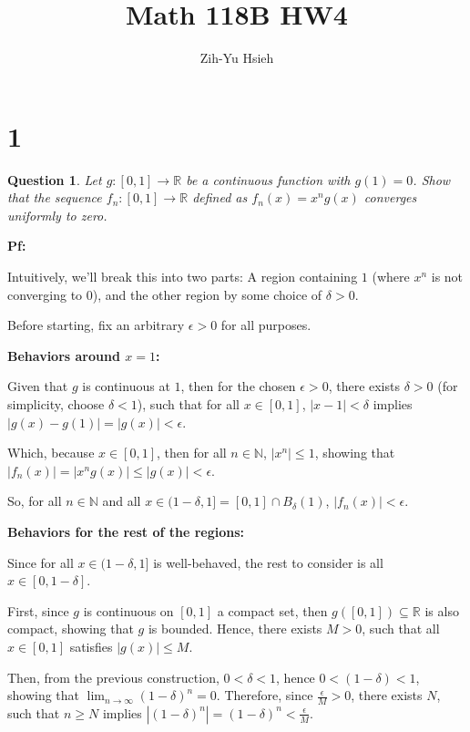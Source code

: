 \documentclass{article}
\title{Math 118B HW4}
\author{Zih-Yu Hsieh}
\newtheorem{question}{Question}
\begin{document}
\maketitle

\section*{1}
\begin{myBox}[]{}
    \begin{question}
        Let $g : [0, 1]\rightarrow\mathbb{R}$ be a continuous function with $g(1) = 0$. Show that the
        sequence $f_n:[0,1]\rightarrow\mathbb{R}$ defined as $f_n(x)=x^ng(x)$ converges uniformly to zero.
    \end{question}
\end{myBox}

\textbf{Pf:}

Intuitively, we'll break this into two parts: A region containing $1$ (where $x^n$ is not converging to $0$),
and the other region by some choice of $\delta>0$.

Before starting, fix an arbitrary $\epsilon>0$ for all purposes.

\hfill

\textbf{Behaviors around $x=1$:}

Given that $g$ is continuous at $1$, then for the chosen $\epsilon>0$, there exists $\delta>0$ (for simplicity, choose $\delta<1$),
such that for all $x\in[0,1]$, $|x-1|<\delta$ implies $|g(x)-g(1)| = |g(x)|<\epsilon$.

Which, because $x\in [0,1]$, then for all $n\in\mathbb{N}$, $|x^n| \leq 1$, showing that $|f_n(x)| = |x^ng(x)| \leq |g(x)|<\epsilon$.

So, for all $n\in\mathbb{N}$ and all $x\in (1-\delta,1] = [0,1]\cap B_\delta(1)$, $|f_n(x)|<\epsilon$.

\hfill

\textbf{Behaviors for the rest of the regions:}

Since for all $x\in (1-\delta,1]$ is well-behaved, the rest to consider is all $x\in [0,1-\delta]$.

First, since $g$ is continuous on $[0,1]$ a compact set, then $g([0,1])\subseteq \mathbb{R}$ is also compact, showing that $g$ is bounded.
Hence, there exists $M>0$, such that all $x\in [0,1]$ satisfies $|g(x)|\leq M$.

Then, from the previous construction, $0<\delta<1$, hence $0<(1-\delta)<1$,
showing that $\lim_{n\rightarrow\infty}(1-\delta)^n=0$. Therefore, since $\frac{\epsilon}{M}>0$, there exists $N$, such that $n\geq N$ implies $|(1-\delta)^n|=(1-\delta)^n<\frac{\epsilon}{M}$.
\end{document}
